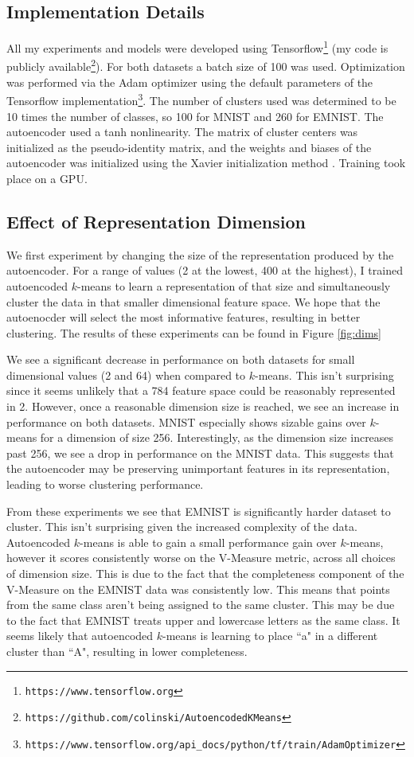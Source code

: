 \subsection{Implementation Details}
All my experiments and models were developed using Tensorflow\footnote{\texttt{https://www.tensorflow.org}} (my code is publicly available\footnote{\texttt{https://github.com/colinski/AutoencodedKMeans}}). For both datasets a batch size of 100 was used. Optimization was performed via the Adam optimizer \cite{adam} using the default parameters of the Tensorflow implementation\footnote{\texttt{https://www.tensorflow.org/api\_docs/python/tf/train/AdamOptimizer}}. The number of clusters used was determined to be 10 times the number of classes, so 100 for MNIST and 260 for EMNIST. The autoencoder used a tanh nonlinearity. The matrix of cluster centers was initialized as the pseudo-identity matrix, and the weights and biases of the autoencoder was initialized using the Xavier initialization method \cite{xavier}. Training took place on a GPU.

\subsection{Effect of Representation Dimension}
We first experiment by changing the size of the representation produced by the autoencoder. For a range of values (2 at the lowest, 400 at the highest), I trained autoencoded $k$-means to learn a representation of that size and simultaneously cluster the data in that smaller dimensional feature space. We hope that the autoenocder will select the most informative features, resulting in better clustering. The results of these experiments can be found in Figure \ref{fig:dims}

We see a significant decrease in performance on both datasets for small dimensional values (2 and 64) when compared to $k$-means. This isn't surprising since it seems unlikely that a 784 feature space could be reasonably represented in 2. However, once a reasonable dimension size is reached, we see an increase in performance  on both datasets. MNIST especially shows sizable gains over $k$-means for a dimension of size 256. Interestingly, as the dimension size increases past 256, we see a drop in performance on the MNIST data. This suggests that the autoencoder may be preserving unimportant features in its representation, leading to worse clustering performance.

From these experiments we see that EMNIST is significantly harder dataset to cluster. This isn't surprising given the increased complexity of the data. Autoencoded $k$-means is able to gain a small performance gain over $k$-means, however it scores consistently worse on the V-Measure metric, across all choices of dimension size. This is due to the fact that the completeness component of the V-Measure on the EMNIST data was consistently low. This means that points from the same class aren't being assigned to the same cluster. This may be due to the fact that EMNIST treats upper and lowercase letters as the same class. It seems likely that autoencoded $k$-means is learning to place ``a" in a different cluster than ``A", resulting in lower completeness.

